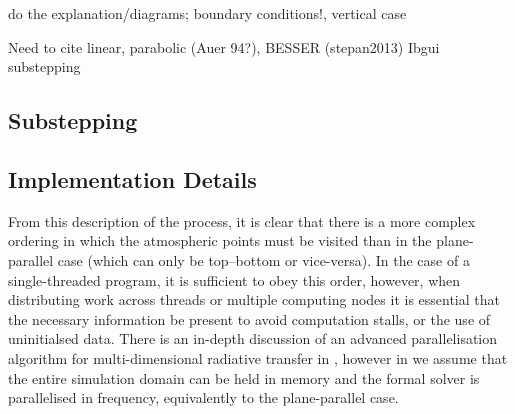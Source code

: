 

{\color{TolBlue} do the explanation/diagrams; boundary conditions!, vertical case}

{\color{Red} Need to cite linear, parabolic (Auer 94?), BESSER (stepan2013) Ibgui substepping}

\subsection{Substepping}

\subsection{Implementation Details}

From this description of the process, it is clear that there is a more complex ordering in which the atmospheric points must be visited than in the plane-parallel case (which can only be top--bottom or vice-versa).
In the case of a single-threaded program, it is sufficient to obey this order, however, when distributing work across threads or multiple computing nodes it is essential that the necessary information be present to avoid computation stalls, or the use of uninitialsed data.
There is an in-depth discussion of an advanced parallelisation algorithm for multi-dimensional radiative transfer in \citet{Stepan2013}, however in \Lw{} we assume that the entire simulation domain can be held in memory and the formal solver is parallelised in frequency, equivalently to the plane-parallel case.

